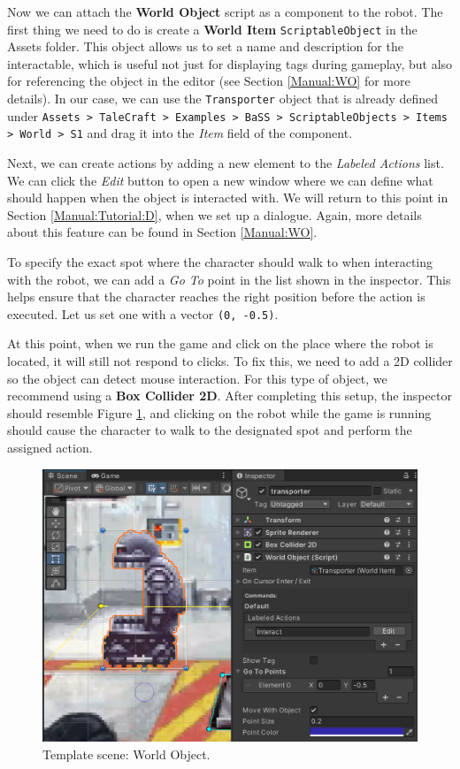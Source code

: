 Now we can attach the \textbf{World Object} script as a component to the robot. The first thing we need to do is create a \textbf{World Item} \verb|ScriptableObject| in the Assets folder. This object allows us to set a name and description for the interactable, which is useful not just for displaying tags during gameplay, but also for referencing the object in the editor (see Section \ref{Manual:WO} for more details). In our case, we can use the \texttt{Transporter} object that is already defined under \texttt{Assets > TaleCraft > Examples > BaSS > ScriptableObjects > Items > World > S1} and drag it into the \textit{Item} field of the component.

Next, we can create actions by adding a new element to the \textit{Labeled Actions} list. We can click the \textit{Edit} button to open a new window where we can define what should happen when the object is interacted with. We will return to this point in Section \ref{Manual:Tutorial:D}, when we set up a dialogue. Again, more details about this feature can be found in Section \ref{Manual:WO}.

To specify the exact spot where the character should walk to when interacting with the robot, we can add a \textit{Go To} point in the list shown in the inspector. This helps ensure that the character reaches the right position before the action is executed. Let us set one with a vector \texttt{(0, -0.5)}.

At this point, when we run the game and click on the place where the robot is located, it will still not respond to clicks. To fix this, we need to add a 2D collider so the object can detect mouse interaction. For this type of object, we recommend using a \textbf{Box Collider 2D}. After completing this setup, the inspector should resemble Figure \ref{fig:Tutorial-template:WO}, and clicking on the robot while the game is running should cause the character to walk to the designated spot and perform the assigned action.

\begin{figure}[H]
\centering
\includegraphics[width=0.8\linewidth]{img/User doc/image_2025-07-08_120956206.png}
\caption{Template scene: World Object.}
\label{fig:Tutorial-template:WO}
\end{figure}

